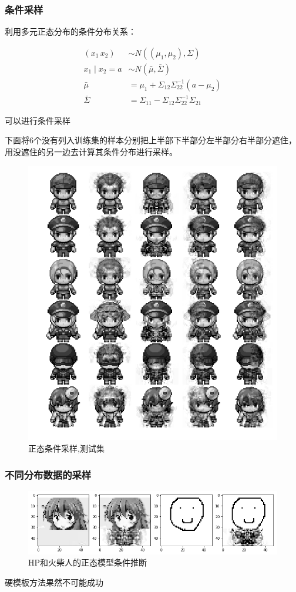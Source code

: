 \documentclass{beamer}
\begin{document}
\begin{frame}
\frametitle{条件采样}
利用多元正态分布的条件分布关系：

\begin{align*}
    (x_1 \, x_2) &\sim N((\mu_1,\mu_2),\Sigma) \\ 
    x_1 \mid x_2 = a &\sim N(\bar{\mu},\bar{\Sigma}) \\
    \bar{\mu} &= \mu_1 + \Sigma_{12}\Sigma^{-1}_{22}(a - \mu_2) \\
    \bar{\Sigma} &= \Sigma_{11} - \Sigma_{12}\Sigma_{22}^{-1}\Sigma_{21}
\end{align*}

可以进行条件采样
    
\end{frame}

\begin{frame}
下面将6个没有列入训练集的样本分别把上半部下半部分左半部分右半部分遮住，
用没遮住的另一边去计算其条件分布进行采样。

\begin{figure}[htb]
    \centering
    \includegraphics[width=0.6\linewidth]{normal_conditional_sample.png}
    \caption{正态条件采样,测试集}
    \label{fig:normcond1}
  \end{figure}
\end{frame}

\begin{frame}
\frametitle{不同分布数据的采样}

\begin{figure}[htb]
    \centering
      \includegraphics[width=\linewidth]{normal_real_test.png}
      \caption{HP和火柴人的正态模型条件推断}
      \label{fig:normalreal}
  \end{figure}
硬模板方法果然不可能成功
\end{frame}
\end{document}
